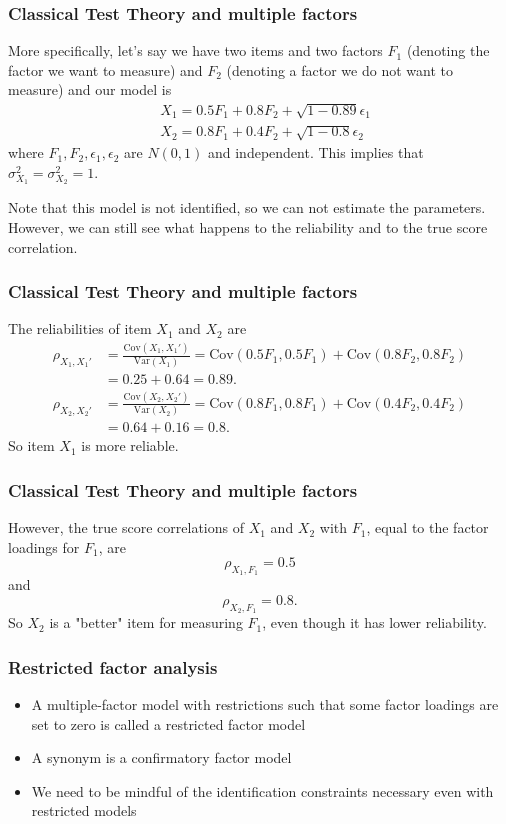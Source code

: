 \documentclass[compress]{beamer}
\begin{document}
\begin{frame}[fragile]
\frametitle{Classical Test Theory and multiple factors}
More specifically, let's say we have two items and two factors $F_1$ (denoting the factor we want to measure) and $F_2$ (denoting a factor we do not want to measure) and our model is
\begin{align*}
&X_1 = 0.5F_1 + 0.8F_2+\sqrt{1-0.89}\epsilon_1\\
&X_2 = 0.8F_1 + 0.4F_2+\sqrt{1-0.8}\epsilon_2
\end{align*}
where $F_1, F_2, \epsilon_1, \epsilon_2$ are $N(0, 1)$ and independent. This implies that $\sigma_{X_1}^2=\sigma_{X_2}^2=1$.

Note that this model is not identified, so we can not estimate the parameters. However, we can still see what happens to the reliability and to the true score correlation.
\end{frame}

\begin{frame}[fragile]
\frametitle{Classical Test Theory and multiple factors}
The reliabilities of item $X_1$ and $X_2$ are 
\begin{align*}
\rho_{X_1, X_1'}&=\frac{\mathrm{Cov}(X_1, X_1')}{\mathrm{Var}(X_1)}=\mathrm{Cov}(0.5F_1,0.5F_1) + \mathrm{Cov}(0.8F_2,0.8F_2)\\
&= 0.25 + 0.64 = 0.89.
\end{align*}
\begin{align*}
\rho_{X_2, X_2'}&=\frac{\mathrm{Cov}(X_2, X_2')}{\mathrm{Var}(X_2)}=\mathrm{Cov}(0.8F_1,0.8F_1) + \mathrm{Cov}(0.4F_2,0.4F_2)\\
&= 0.64 + 0.16 = 0.8.
\end{align*}
So item $X_1$ is more reliable.
\end{frame}

\begin{frame}[fragile]
\frametitle{Classical Test Theory and multiple factors}
However, the true score correlations of $X_1$ and $X_2$ with $F_1$, equal to the factor loadings for $F_1$, are
\[
\rho_{X_1, F_1}=0.5
\]
and
\[
\rho_{X_2, F_1}=0.8.
\]
So $X_2$ is a "better" item for measuring $F_1$, even though it has lower reliability.
\end{frame}


\begin{frame}[fragile]
\frametitle{Restricted factor analysis}
\begin{itemize}
\item A multiple-factor model with restrictions such that some factor loadings are set to zero is called a restricted factor model
\item A synonym is a confirmatory factor model
\item We need to be mindful of the identification constraints necessary even with restricted models
\end{itemize}
\end{frame}
\end{document}
